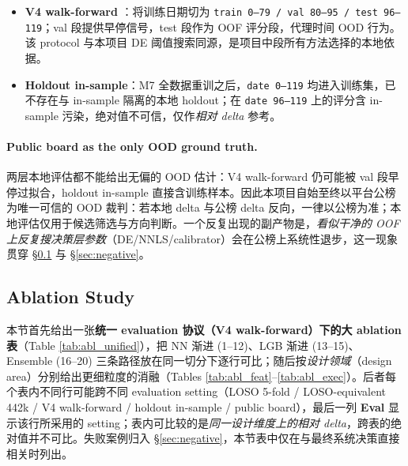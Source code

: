 \documentclass[11pt]{article}
\begin{document}
\begin{itemize}
  \item \textbf{V4 walk-forward} \cite{walk_forward}：将训练日期切为 \texttt{train 0--79 / val 80--95 / test 96--119}；val 段提供早停信号，test 段作为 OOF 评分段，代理时间 OOD 行为。该 protocol 与本项目 DE 阈值搜索同源，是项目中段所有方法选择的本地依据。
  \item \textbf{Holdout in-sample}：M7 全数据重训之后，\texttt{date 0--119} 均进入训练集，已不存在与 in-sample 隔离的本地 holdout；在 \texttt{date 96--119} 上的评分含 in-sample 污染，绝对值不可信，仅作\emph{相对 delta} 参考。
\end{itemize}

\paragraph{Public board as the only OOD ground truth.}
两层本地评估都不能给出无偏的 OOD 估计：V4 walk-forward 仍可能被 val 段早停过拟合，holdout in-sample 直接含训练样本。因此本项目自始至终以平台公榜为唯一可信的 OOD 裁判：若本地 delta 与公榜 delta 反向，一律以公榜为准；本地评估仅用于候选筛选与方向判断。一个反复出现的副产物是，\emph{看似干净的 OOF 上反复搜决策层参数}（DE/NNLS/calibrator）会在公榜上系统性退步，这一现象贯穿 \S\ref{sec:abl} 与 \S\ref{sec:negative}。

\subsection{Ablation Study}
\label{sec:abl}

本节首先给出一张\textbf{统一 evaluation 协议（V4 walk-forward）下的大 ablation 表}（Table \ref{tab:abl_unified}），把 NN 渐进 (1--12)、LGB 渐进 (13--15)、Ensemble (16--20) 三条路径放在同一切分下逐行可比；随后按\emph{设计领域}（design area）分别给出更细粒度的消融（Tables \ref{tab:abl_feat}--\ref{tab:abl_exec}）。后者每个表内不同行可能跨不同 evaluation setting（LOSO 5-fold / LOSO-equivalent 442k / V4 walk-forward / holdout in-sample / public board），最后一列 \textbf{Eval} 显示该行所采用的 setting；表内可比较的是\emph{同一设计维度上的相对 delta}，跨表的绝对值并不可比。失败案例归入 \S\ref{sec:negative}，本节表中仅在与最终系统决策直接相关时列出。
\end{document}

